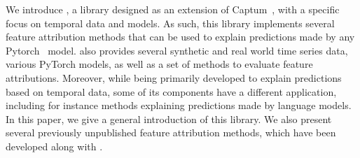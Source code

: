 We introduce \texttt{}, a library designed as an extension of
Captum~\citep{kokhlikyan2020captum}, with a specific focus on temporal data and models.
As such, this library implements several feature attribution methods that can be used to explain predictions made by
any Pytorch~\citep{NEURIPS2019_9015} model.
\texttt{} also provides several synthetic and real world time series data, various PyTorch
models, as well as a set of methods to evaluate feature attributions.
Moreover, while being primarily developed to explain predictions based on temporal data, some of its components have a
different application, including for instance methods explaining predictions made by language models.
In this paper, we give a general introduction of this library.
We also present several previously unpublished feature attribution methods, which have been developed along with
\texttt{}.